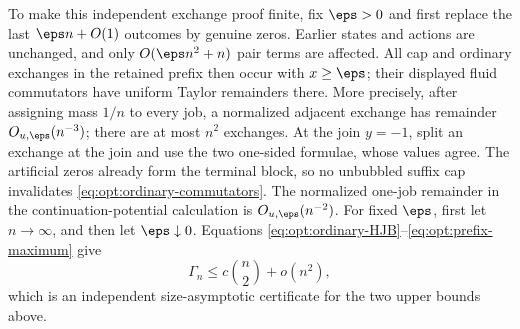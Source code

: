 {To make this independent exchange proof finite, fix
$\eps>0$ and first replace the last
$\eps n+O(1)$ outcomes by genuine zeros.  Earlier states and
actions are unchanged, and only $O(\eps n^2+n)$ pair terms are
affected.  All cap and ordinary exchanges in the retained prefix then
occur with $x\ge\eps$; their displayed fluid commutators have
uniform Taylor remainders there.  More precisely, after assigning mass
$1/n$ to every job, a normalized adjacent exchange has remainder
$O_{u,\eps}(n^{-3})$; there are at most $n^2$ exchanges.  At the
join $y=-1$, split an exchange at the join and use the two one-sided
formulae, whose values agree.  The artificial zeros already form the
terminal block, so no unbubbled suffix cap invalidates
\eqref{eq:opt:ordinary-commutators}.  The normalized one-job remainder in
the continuation-potential calculation is
$O_{u,\eps}(n^{-2})$.  For fixed $\eps$, first let
$n\to\infty$, and then let $\eps\downarrow0$.  Equations
\eqref{eq:opt:ordinary-HJB}--\eqref{eq:opt:prefix-maximum} give
\[
 \Gamma_n\le c\binom n2+o(n^2),
\]
which is an independent size-asymptotic certificate for the two upper
bounds above.
}
